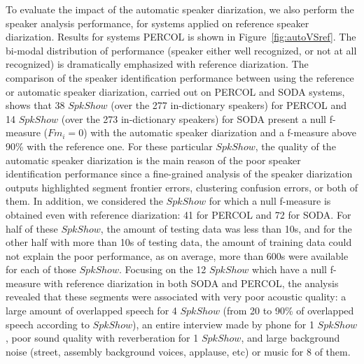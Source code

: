 
To evaluate the impact of the automatic speaker diarization, we also perform the speaker analysis performance, for systems applied on reference speaker diarization. Results for systems PERCOL is shown in Figure~\ref{fig:autoVSref}.  The bi-modal distribution of performance (speaker either well recognized, or not at all recognized) is dramatically emphasized with reference diarization.
The comparison of the speaker identification performance between using the reference or automatic speaker diarization, carried out on PERCOL and SODA systems, shows that 38 $SpkShow$ (over the 277 in-dictionary speakers) for PERCOL and 14 $SpkShow$ (over the 273 in-dictionary speakers) for SODA present a null f-measure ($Fm_i=0$) with the automatic speaker diarization and a f-measure above 90\% with the reference one. For these particular $SpkShow$, the quality of the automatic speaker diarization is the main reason of the poor speaker identification performance since a fine-grained analysis of the speaker diarization outputs highlighted segment frontier errors, clustering confusion errors, or both of them. 
In addition, we considered the $SpkShow$ for which a null f-measure is obtained even with reference diarization: 41 for PERCOL and 72 for SODA. For half of these $SpkShow$, the amount of testing data was less than 10s, and for the other half with more than 10s of testing data, the amount of training data could not explain the poor performance, as on average, more than 600s were available for each of those $SpkShow$.
Focusing on the 12 $SpkShow$ which have a null f-measure with reference diarization in both SODA and PERCOL, the analysis revealed that these segments were associated with very poor acoustic quality: a large amount of overlapped speech for 4 $SpkShow$ (from 20 to 90\% of overlapped speech according to  $SpkShow$), an entire interview made by phone for 1 $SpkShow$, poor sound quality with reverberation for 1 $SpkShow$, and large background noise (street, assembly background voices, applause, etc) or music for 8 of them.


